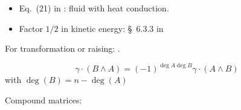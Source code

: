 \documentclass[\ifafour a4paper,12pt,\else a5paper,10pt,\fi%
onecolumn,oneside,article,%
british%
]{memoir}
\theoremstyle{remark}
\theoremstyle{innote}
\renewcommand*{\finalnamedelim}{\addspace\amp\space}
\newcommand*{\amp}{\&}
\renewcommand*{\bm}[1]{\textpdfrender{TextRenderingMode=2,LineWidth=0.1pt}{\boldsymbol{#1}}}
\renewcommand*{\|}[1][]{\nonscript\:#1\vert\nonscript\:\mathopen{}}
\newcommand*{\sect}{\S}%
\newcommand*{\eqn}{eq.}%
\begin{document}
\begin{itemize}
\item Eq.~(21) in \autocites{maugin1974b}: fluid with heat conduction.
\item Factor $1/2$ in kinetic energy: \sect~6.3.3 in \autocites{gourgoulhon2007_r2012}
\end{itemize}

For transformation or raising:  \autocites[\sect~I.4 \eqn~(33)]{gantmacher1959_r2000}.

\begin{equation}
  \gamma\cdot (B\land A) = (-1)^{\deg{A}\deg{B}} \gamma\cdot(A \land B)
\end{equation}
with $\deg(B) = n-\deg(A)$
\autocites[prop.~4.1]{barnabeietal1985}




Compound matrices:  \autocites[\sect~IV.A.1 p.~199, Problem~1 p.~270]{choquetbruhatetal1977_r1996}

 
\renewcommand*{\finalnamedelim}{\addcomma\space}

\printbibliography[prenote=prenote%
]
\end{document}
